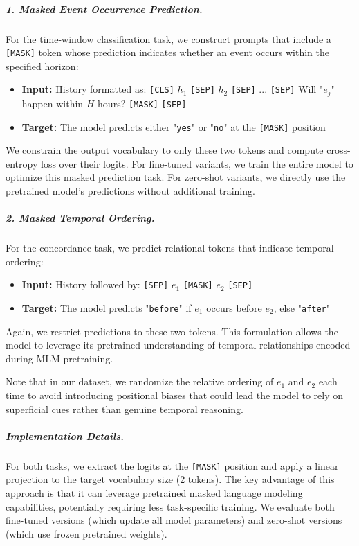 \subparagraph{1. Masked Event Occurrence Prediction.}
For the time-window classification task, we construct prompts that include a \texttt{[MASK]} token whose prediction indicates whether an event occurs within the specified horizon:

\begin{itemize}
    \item \textbf{Input:} History formatted as: \texttt{[CLS]} $h_1$ \texttt{[SEP]} $h_2$ \texttt{[SEP]} ... \texttt{[SEP]} Will "$e_j$" happen within $H$ hours? \texttt{[MASK]} \texttt{[SEP]}
    \item \textbf{Target:} The model predicts either "\texttt{yes}" or "\texttt{no}" at the \texttt{[MASK]} position
\end{itemize}

We constrain the output vocabulary to only these two tokens and compute cross-entropy loss over their logits. For fine-tuned variants, we train the entire model to optimize this masked prediction task. For zero-shot variants, we directly use the pretrained model's predictions without additional training.

\subparagraph{2. Masked Temporal Ordering.}
For the concordance task, we predict relational tokens that indicate temporal ordering:

\begin{itemize}
    \item \textbf{Input:} History followed by: \texttt{[SEP]} $e_1$ \texttt{[MASK]} $e_2$ \texttt{[SEP]}
    \item \textbf{Target:} The model predicts "\texttt{before}" if $e_1$ occurs before $e_2$, else "\texttt{after}"
\end{itemize}

Again, we restrict predictions to these two tokens. This formulation allows the model to leverage its pretrained understanding of temporal relationships encoded during MLM pretraining. 

Note that in our dataset, we randomize the relative ordering of $e_1$ and $e_2$ each time to avoid introducing positional biases that could lead the model to rely on superficial cues rather than genuine temporal reasoning.

\subparagraph{Implementation Details.}
For both tasks, we extract the logits at the \texttt{[MASK]} position and apply a linear projection to the target vocabulary size (2 tokens). The key advantage of this approach is that it can leverage pretrained masked language modeling capabilities, potentially requiring less task-specific training. We evaluate both fine-tuned versions (which update all model parameters) and zero-shot versions (which use frozen pretrained weights).

